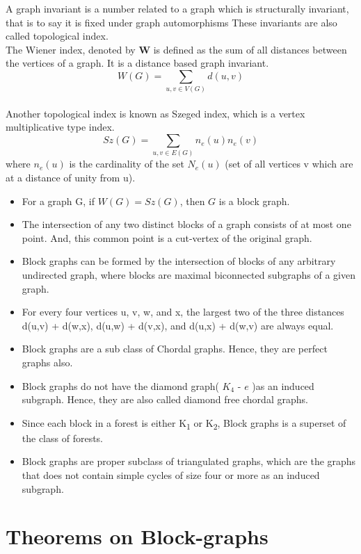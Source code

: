 \documentclass{memoir}
\begin{document}
A graph invariant is a number related to a graph which is structurally invariant, that is to say it is fixed under graph automorphisms These invariants are also called topological index. \\The Wiener index, denoted by \textbf{W} is defined as the sum of all distances between the vertices of a graph. It is a distance based graph invariant.
\begin{equation}
    W(G)=\sum_{{u,v}\in{V(G)}}d(u,v)
\end{equation}
\\Another topological index is known as Szeged index, which is a vertex multiplicative type index.
\begin{equation}
    Sz(G)=\sum_{{u,v}\in{E(G)}}n_e(u) n_e(v)
\end{equation}
where $n_e(u)$ is the cardinality of the set $N_e(u)$ (set of all vertices v which are at a distance of unity from u).
\\
\begin{itemize}
    \item For a graph G, if $W(G)=Sz(G)$, then $G$ is a block graph.
    \item The intersection of any two distinct blocks of a graph consists of at most one point. And, this common point is a cut-vertex of the original graph.
    \item Block graphs can be formed by the intersection of blocks of any arbitrary undirected graph, where blocks are maximal biconnected subgraphs of a given graph.
    \item For every four vertices u, v, w, and x, the largest two of the three distances d(u,v) + d(w,x), d(u,w) + d(v,x), and d(u,x) + d(w,v) are always equal.
    \item Block graphs are a sub class of Chordal graphs. Hence, they are perfect graphs also.
    \item Block graphs do not have the diamond graph( $K_4$ - $e$ )as an induced subgraph. Hence, they are also called diamond free chordal graphs.
    \item Since each block in a forest is either K\textsubscript{1} or K\textsubscript{2}, Block graphs is a superset of the class of forests. 
    \item Block graphs are proper subclass of triangulated graphs, which are the graphs that does not contain simple cycles of size four or more as an induced subgraph.
\end{itemize}
\section*{Theorems on Block-graphs}
\end{document}
